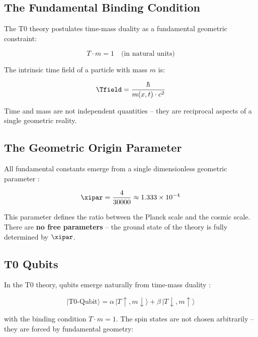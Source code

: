 \subsection{The Fundamental Binding Condition}

The T0 theory postulates time-mass duality as a fundamental geometric constraint:

\begin{equation}
    T \cdot m = 1 \quad \text{(in natural units)}
    \label{eq:t0_constraint}
\end{equation}

The intrinsic time field of a particle with mass $m$ is:

\begin{equation}
    \Tfield = \frac{\hbar}{m(x,t) \cdot c^2}
    \label{eq:t0_timefield}
\end{equation}

Time and mass are not independent quantities -- they are reciprocal aspects of a
single geometric reality.

\subsection{The Geometric Origin Parameter}

All fundamental constants emerge from a single dimensionless geometric parameter
\cite{pascher_xi_2025}:

\begin{equation}
    \xipar = \frac{4}{30000} \approx 1.333 \times 10^{-4}
    \label{eq:xi_param}
\end{equation}

This parameter defines the ratio between the Planck scale and the cosmic scale.
There are \textbf{no free parameters} -- the ground state of the theory is fully
determined by $\xipar$.

\subsection{T0 Qubits}

In the T0 theory, qubits emerge naturally from time-mass duality
\cite{pascher_quantum_2025}:

\begin{equation}
    |\text{T0-Qubit}\rangle = \alpha \, |T{\uparrow}, m{\downarrow}\rangle
    + \beta \, |T{\downarrow}, m{\uparrow}\rangle
    \label{eq:t0_qubit}
\end{equation}

with the binding condition $T \cdot m = 1$. The spin states are not chosen
arbitrarily -- they are forced by fundamental geometry:

